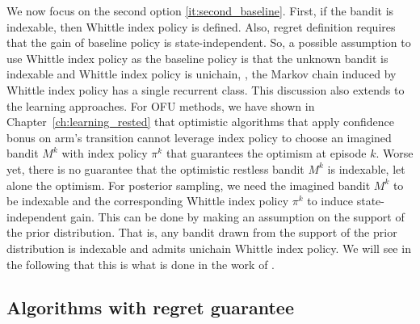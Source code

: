We now focus on the second option \ref{it:second_baseline}.
First, if the bandit is indexable, then Whittle index policy is defined.
Also, regret definition requires that the gain of baseline policy is state-independent.
So, a possible assumption to use Whittle index policy as the baseline policy is that the unknown bandit is indexable and Whittle index policy is unichain, \ie, the Markov chain induced by Whittle index policy has a single recurrent class.
This discussion also extends to the learning approaches.
For OFU methods, we have shown in Chapter~\ref{ch:learning_rested} that optimistic algorithms that apply confidence bonus on arm's transition cannot leverage index policy to choose an imagined bandit $M^k$ with index policy $\pi^k$ that guarantees the optimism at episode $k$.
Worse yet, there is no guarantee that the optimistic restless bandit $M^k$ is indexable, let alone the optimism.
For posterior sampling, we need the imagined bandit $M^k$ to be indexable and the corresponding Whittle index policy $\pi^k$ to induce state-independent gain.
This can be done by making an assumption on the support of the prior distribution.
That is, any bandit drawn from the support of the prior distribution is indexable and admits unichain Whittle index policy.
We will see in the following that this is what is done in the work of \cite{akbarzadeh2022learning}.

\subsection{Algorithms with regret guarantee}

